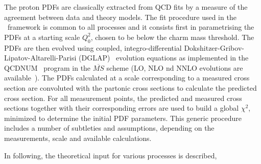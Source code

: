 
\label{sec:theory}
\def\kt{\ensuremath{k_t}}
\newcommand{\Pmax}{p}
\newcommand{\CCFM}{CCFMa,CCFMb,Catani:1989sg,CCFMd}

The proton PDFs are classically extracted from QCD fits by a measure of 
the agreement between data and theory models.
The fit procedure used in the \fitter\ framework is common to all processes and it consists first 
in parametrising the PDFs at a starting scale  $Q^2_0$, chosen to be below the charm mass threshold. 
The PDFs are then evolved using coupled, integro-differential
Dokshitzer-Gribov-Lipatov-Altarelli-Parisi (DGLAP)~\cite{Gribov:1972ri,Gribov:1972rt,Lipatov:1974qm,
Dokshitzer:1977sg,Altarelli:1977zs} evolution equations 
as implemented in the QCDNUM~\cite{qcdnum} program in the $\overline{MS}$ scheme 
(LO, NLO nd NNLO evolutions are available~\cite{Curci:1980uw,Furmanski:1980cm}).
The PDFs calculated at a scale corresponding to a measured cross section are convoluted with the partonic 
cross sections to calculate the predicted cross section. For all measurement points, the predicted 
and measured cross sections together with their corresponding errors are used to build a global $\chi^2$, 
minimized to determine the initial PDF parameters. This generic procedure includes a number of 
subtleties and assumptions, depending on the measurements, scale and available calculations.

In following, the theoretical input for various processes is described,
